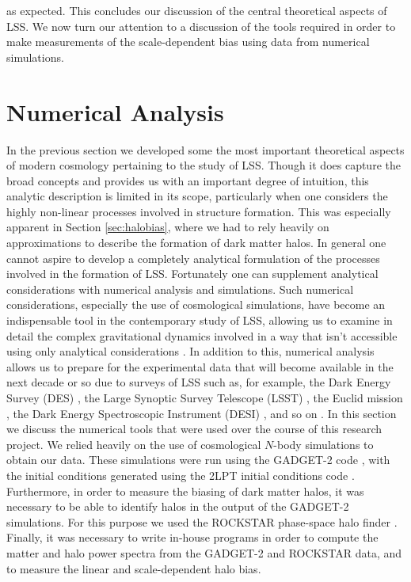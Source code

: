 \documentclass[10pt,letterpaper,final]{iopart}
\numberwithin{equation}{subsection}
\def\ni{\noindent}
\begin{document}
\ni as expected. This concludes our discussion of the central theoretical aspects of LSS. We now turn our attention to a discussion of the tools required in order to make measurements of the scale-dependent bias using data from numerical simulations.



%

\section{Numerical Analysis}\label{sec:num}

In the previous section we developed some the most important theoretical aspects of modern cosmology pertaining to the study of LSS. Though it does capture the broad concepts and provides us with an important degree of intuition, this analytic description is limited in its scope, particularly when one considers the highly non-linear processes involved in structure formation. This was especially apparent in Section \ref{sec:halobias}, where we had to rely heavily on approximations to describe the formation of dark matter halos.  In general one cannot aspire to develop a completely analytical formulation of the processes involved in the formation of LSS. Fortunately one can supplement analytical considerations with numerical analysis and simulations. Such numerical considerations, especially the use of cosmological simulations, have become an indispensable tool in the contemporary study of LSS, allowing us to examine in detail the complex gravitational dynamics involved in a way that isn't accessible using only analytical considerations \cite{Schneider}\cite{Bernardeau}\cite{Gadget1}\cite{Gadget2}. In addition to this, numerical analysis allows us to prepare for the experimental data that will become available in the next decade or so due to surveys of LSS such as, for example, the Dark Energy Survey (DES) \cite{DES}, the Large Synoptic Survey Telescope (LSST) \cite{LSST}, the Euclid mission \cite{Euclid}, the Dark Energy Spectroscopic Instrument (DESI) \cite{DESI}, and so on \cite{LSSSurveys}. In this section we discuss the numerical tools that were used over the course of this research project. We relied heavily on the use of cosmological $N$-body simulations to obtain our data. These simulations were run using the GADGET-2 code \cite{Gadget1}\cite{Gadget2}, with the initial conditions generated using the 2LPT initial conditions code \cite{2lpt}. Furthermore, in order to measure the biasing of dark matter halos, it was necessary to be able to identify halos in the output of the GADGET-2 simulations. For this purpose we used the ROCKSTAR phase-space halo finder \cite{Rockstar}. Finally, it was necessary to write in-house programs in order to compute the matter and halo power spectra from the GADGET-2 and ROCKSTAR data, and to measure the linear and scale-dependent halo bias. 
\end{document}
